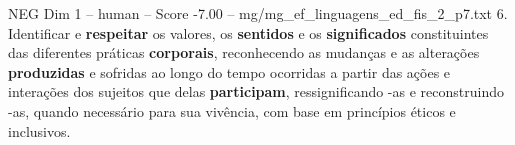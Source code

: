 \begin{textsample}{NEG Dim 1 – human – Score -7.00 – mg/mg\_ef\_linguagens\_ed\_fis\_2\_p7.txt}  \label{ex:f1_neg_002}
6.
Identificar e \textbf{respeitar} os valores, os \textbf{sentidos} e os \textbf{significados} constituintes das diferentes práticas \textbf{corporais}, reconhecendo as mudanças e as alterações \textbf{produzidas} e sofridas ao longo do tempo ocorridas a partir das ações e interações dos sujeitos que delas \textbf{participam}, ressignificando -as e reconstruindo -as, quando necessário para sua vivência, com base em princípios éticos e inclusivos.

\end{textsample}
